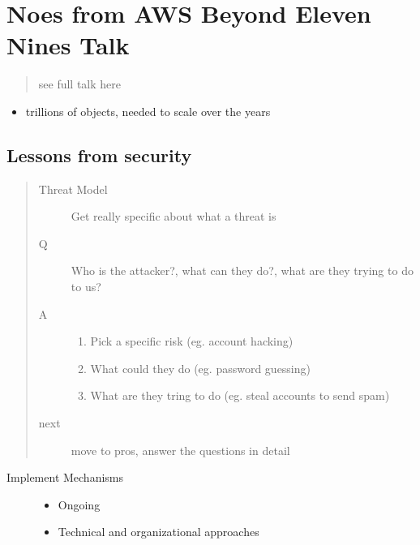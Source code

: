 \documentclass[letterpaper,10pt,english]{sphinxmanual}
\begin{document}
\chapter{Noes from AWS Beyond Eleven Nines Talk}
\label{\detokenize{aws_beyondelevennines_talk:noes-from-aws-beyond-eleven-nines-talk}}\label{\detokenize{aws_beyondelevennines_talk::doc}}\begin{quote}\begin{description}
\item[{see full talk here}] \leavevmode
{}

\end{description}\end{quote}
\begin{itemize}
\item {} 
trillions of objects, needed to scale over the years

\end{itemize}


\section{Lessons from security}
\label{\detokenize{aws_beyondelevennines_talk:lessons-from-security}}\begin{quote}\begin{description}
\item[{Threat Model}] \leavevmode
Get really specific about what a threat is

\item[{Q}] \leavevmode
Who is the attacker?, what can they do?, what are they trying to do to us?

\item[{A}] \leavevmode\begin{enumerate}
%
\item {} 
Pick a specific risk (eg. account hacking)

\item {} 
What could they do (eg. password guessing)

\item {} 
What are they tring to do (eg. steal accounts to send spam)

\end{enumerate}

\item[{next}] \leavevmode
move to pros, answer the questions in detail

\end{description}\end{quote}
\begin{description}
\item[{Implement Mechanisms}] \leavevmode\begin{itemize}
\item {} 
Ongoing

\item {} 
Technical and organizational approaches

\end{itemize}

\end{description}
\end{document}
